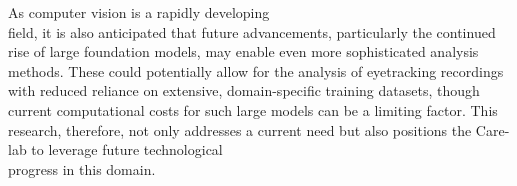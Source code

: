 \documentclass[english]{hogent-article}
\begin{document}
As computer vision is a rapidly developing\\ field, it is also anticipated that future advancements, 
particularly the continued rise of large foundation models, may enable even more sophisticated analysis methods. 
These could potentially allow for the analysis of eyetracking recordings with reduced reliance on extensive, 
domain-specific training datasets, though current computational costs for such large models can be a limiting factor. 
This research, therefore, not only addresses a current need but also positions the Care-lab to leverage future technological\\ progress in this domain.

\begingroup
\setlength{\emergencystretch}{3em}
\printbibliography[heading=bibintoc]
\endgroup
\end{document}
